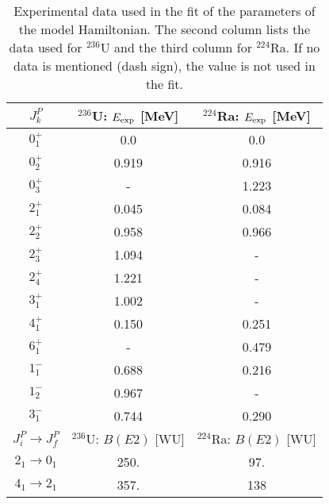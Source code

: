 \documentclass[12pt]{article}
\begin{document}
\begin{center}
\begin{table}[h!]
\centering
\begin{tabular}{|c|c|c|}
\hline\hline
$J_k^P$ & $^{236}$U: $E_{{\rm exp}}$ [MeV] & $^{224}$Ra: $E_{{\rm exp}}$ [MeV] \\
\hline
$0_1^+$ & 0.0 & 0.0 \\
$0_2^+$ & 0.919 & 0.916 \\
$0_3^+$ & - & 1.223 \\
$2_1^+$ & 0.045 & 0.084 \\
$2_2^+$ & 0.958 & 0.966 \\
$2_3^+$ & 1.094 & - \\
$2_4^+$ & 1.221 & - \\
$3_1^+$ & 1.002 & - \\
$4_1^+$ & 0.150 & 0.251 \\
$6_1^+$ & - & 0.479 \\
$1_1^-$ & 0.688 & 0.216 \\
$1_2^-$ & 0.967 & - \\
$3_1^-$ & 0.744 & 0.290 \\
\hline
$J_i^P \rightarrow J_f^P$ & $^{236}$U: $B(E2)$ [WU] & $^{224}$Ra: $B(E2)$ [WU] \\
\hline
$2_1 \rightarrow 0_1$ & 250. & 97. \\
$4_1 \rightarrow 2_1$ & 357. & 138 \\
\hline 
 \end{tabular}
\caption{
Experimental data used in the fit of the parameters of the model Hamiltonian. The second column lists
the data used for $^{236}$U and the third column for $^{224}$Ra. If no data is mentioned (dash sign), 
the value is not used in the fit.
} 
\vspace{0.2cm}
\label{fit-U-Ra}
\end{table}
\end{center}
\end{document}
